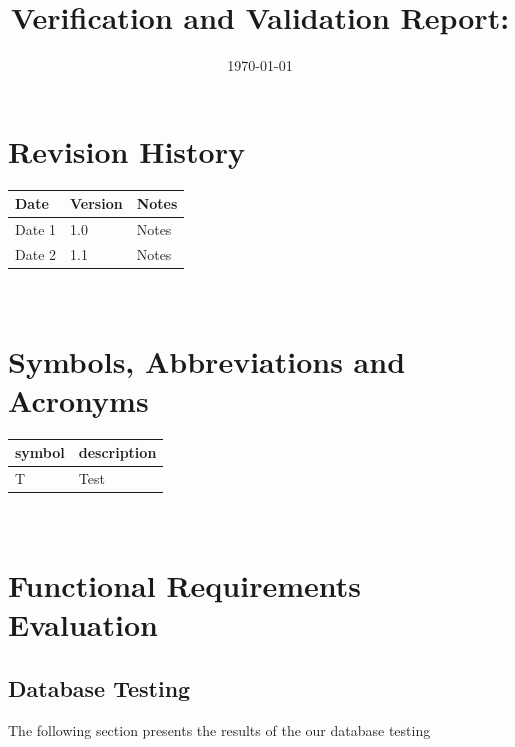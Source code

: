 \documentclass[12pt, titlepage]{article}
\begin{document}
\title{Verification and Validation Report: \progname}
\author{\authname}
\date{\today}

\maketitle


\section{Revision History}

\begin{tabularx}{\textwidth}{p{3cm}p{2cm}X}
  \toprule {\bf Date} & {\bf Version} & {\bf Notes} \\
  \midrule
  Date 1              & 1.0           & Notes       \\
  Date 2              & 1.1           & Notes       \\
  \bottomrule
\end{tabularx}

~\newpage

\section{Symbols, Abbreviations and Acronyms}

\renewcommand{\arraystretch}{1.2}
\begin{tabular}{l l}
  \toprule
  \textbf{symbol} & \textbf{description} \\
  \midrule
  T               & Test                 \\
  \bottomrule
\end{tabular}\\

\newpage

\tableofcontents

\listoftables %

\listoffigures %

\newpage


\section{Functional Requirements Evaluation}

\subsection{Database Testing}
The following section presents the results of the our database testing
\end{document}
